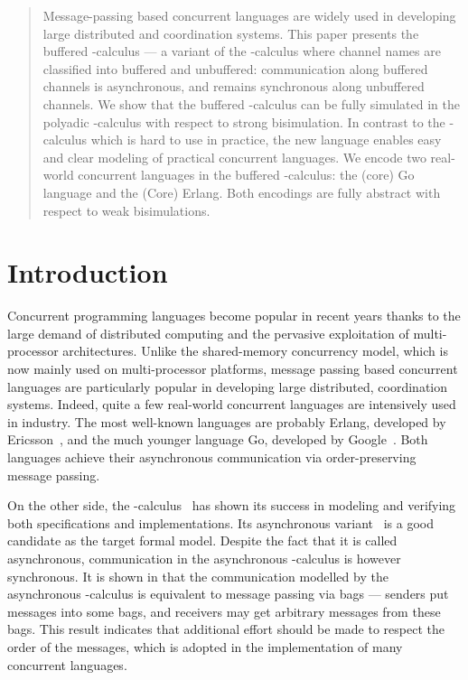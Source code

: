 \documentclass[runningheads, envcountsame, a4paper]{llncs}
\begin{document}
\maketitle
\setcounter{footnote}{0}


\begin{abstract}
Message-passing based concurrent languages are widely used in developing large distributed and coordination systems.
This paper presents the buffered -calculus --- a variant of the -calculus where channel names
are classified into buffered and unbuffered: communication along buffered channels is asynchronous,
and remains synchronous along unbuffered channels.
We show that the buffered -calculus can be fully simulated in the polyadic -calculus with respect to strong bisimulation.
In contrast to the -calculus which is hard to use in practice, the new language enables easy and clear modeling
of practical concurrent languages. We encode two real-world concurrent languages in the buffered -calculus:
the (core) Go language and the (Core) Erlang. Both encodings are fully abstract with respect to weak bisimulations.

\end{abstract}


\section{Introduction}
\label{sec:intro}

Concurrent programming languages become popular in recent years thanks to the large demand of distributed computing and
the pervasive exploitation of multi-processor architectures. Unlike the shared-memory concurrency model, which is now mainly
used on multi-processor platforms, message passing based concurrent languages are particularly popular in developing
large distributed, coordination systems.
Indeed, quite a few real-world concurrent languages are intensively used in industry.
The most well-known languages are probably Erlang, developed by Ericsson~\cite{Armstrong1997},
and the much younger language Go, developed by Google~\cite{GoSpec2012}.
Both languages achieve their asynchronous communication via order-preserving message passing.

On the other side, the -calculus~\cite{Milner1992,Sangiorgi2001} has shown its success
in modeling and verifying both specifications and implementations.
Its asynchronous variant~\cite{Boudol1992,Honda1991} is a good candidate as the target formal model.
Despite the fact that it is called asynchronous, communication in the asynchronous -calculus is however synchronous.
It is shown in \cite{Beauxis2008} that the communication modelled by the asynchronous -calculus
is equivalent to message passing via bags --- senders put messages into some bags, and
receivers may get arbitrary messages from these bags.
This result indicates that additional effort should be made to respect the order of the messages,
which is adopted in the implementation of many concurrent languages.
\end{document}
